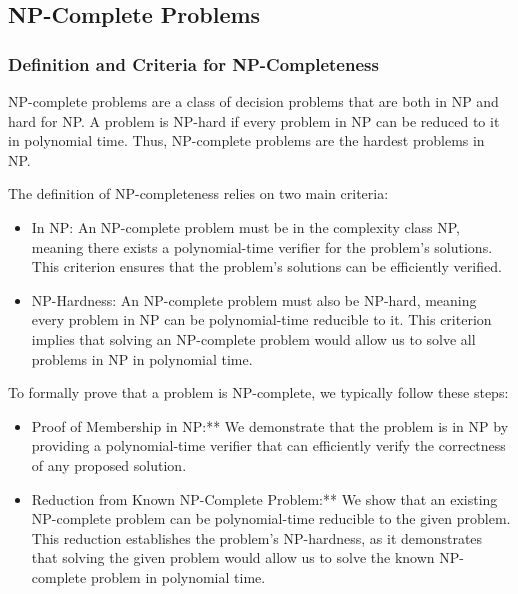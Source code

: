 \documentclass[12pt]{book} %
\begin{document}
\subsection{NP-Complete Problems}

\subsubsection{Definition and Criteria for NP-Completeness}

NP-complete problems are a class of decision problems that are both in NP and hard for NP. A problem is NP-hard if every problem in NP can be reduced to it in polynomial time. Thus, NP-complete problems are the hardest problems in NP.

The definition of NP-completeness relies on two main criteria:
\begin{itemize}
    \item In NP: An NP-complete problem must be in the complexity class NP, meaning there exists a polynomial-time verifier for the problem's solutions. This criterion ensures that the problem's solutions can be efficiently verified.

\item NP-Hardness: An NP-complete problem must also be NP-hard, meaning every problem in NP can be polynomial-time reducible to it. This criterion implies that solving an NP-complete problem would allow us to solve all problems in NP in polynomial time.
\end{itemize}


To formally prove that a problem is NP-complete, we typically follow these steps:
\begin{itemize}
    \item Proof of Membership in NP:** We demonstrate that the problem is in NP by providing a polynomial-time verifier that can efficiently verify the correctness of any proposed solution.
    \item Reduction from Known NP-Complete Problem:** We show that an existing NP-complete problem can be polynomial-time reducible to the given problem. This reduction establishes the problem's NP-hardness, as it demonstrates that solving the given problem would allow us to solve the known NP-complete problem in polynomial time.
    
\end{itemize}
\end{document}
